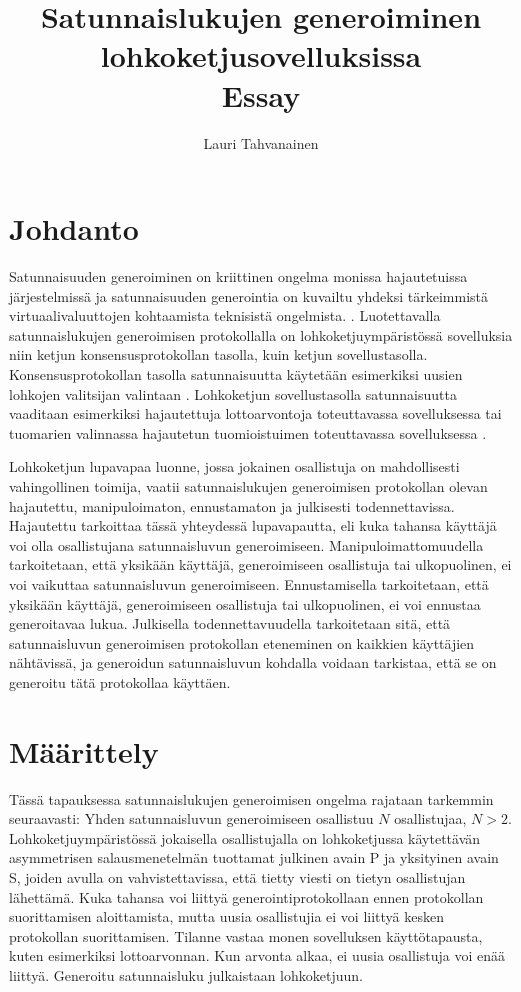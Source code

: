 \documentclass{article}
\title{ Satunnaislukujen generoiminen lohkoketjusovelluksissa \\\small{Essay}}
\author{Lauri Tahvanainen}
\begin{document}
\maketitle

\section{Johdanto}

Satunnaisuuden generoiminen on kriittinen ongelma monissa hajautetuissa järjestelmissä ja satunnaisuuden generointia on kuvailtu yhdeksi tärkeimmistä virtuaalivaluuttojen kohtaamista teknisistä ongelmista. \cite{noauthor_hpoc_2015_nodate}. Luotettavalla satunnaislukujen generoimisen protokollalla on lohkoketjuympäristössä sovelluksia niin ketjun konsensusprotokollan tasolla, kuin ketjun sovellustasolla. Konsensusprotokollan tasolla satunnaisuutta käytetään esimerkiksi uusien lohkojen valitsijan valintaan \cite{chen_algorand_2017}. Lohkoketjun sovellustasolla satunnaisuutta vaaditaan esimerkiksi hajautettuja lottoarvontoja toteuttavassa sovelluksessa \cite{pooltogether_pooltogether_nodate} tai tuomarien valinnassa hajautetun tuomioistuimen toteuttavassa sovelluksessa \cite{lesaege_kleros_2020}. 

Lohkoketjun lupavapaa luonne, jossa jokainen osallistuja on mahdollisesti vahingollinen toimija, vaatii satunnaislukujen generoimisen protokollan olevan hajautettu, manipuloimaton, ennustamaton ja julkisesti todennettavissa. Hajautettu tarkoittaa tässä yhteydessä lupavapautta, eli kuka tahansa käyttäjä voi olla osallistujana satunnaisluvun generoimiseen. Manipuloimattomuudella tarkoitetaan, että yksikään käyttäjä, generoimiseen osallistuja tai ulkopuolinen, ei voi vaikuttaa satunnaisluvun generoimiseen. Ennustamisella tarkoitetaan, että yksikään käyttäjä, generoimiseen osallistuja tai ulkopuolinen, ei voi ennustaa generoitavaa lukua. Julkisella todennettavuudella tarkoitetaan sitä, että satunnaisluvun generoimisen protokollan eteneminen on kaikkien käyttäjien nähtävissä, ja generoidun satunnaisluvun kohdalla voidaan tarkistaa, että se on generoitu tätä protokollaa käyttäen.

\section{Määrittely}

Tässä tapauksessa satunnaislukujen generoimisen ongelma rajataan tarkemmin seuraavasti:
Yhden satunnaisluvun generoimiseen osallistuu $N$ osallistujaa,  $N > 2$. Lohkoketjuympäristössä jokaisella osallistujalla on lohkoketjussa käytettävän asymmetrisen salausmenetelmän tuottamat julkinen avain P ja yksityinen avain S, joiden avulla on vahvistettavissa, että tietty viesti on tietyn osallistujan lähettämä. Kuka tahansa voi liittyä generointiprotokollaan ennen protokollan suorittamisen aloittamista, mutta uusia osallistujia ei voi liittyä kesken protokollan suorittamisen. Tilanne vastaa monen sovelluksen käyttötapausta, kuten esimerkiksi lottoarvonnan. Kun arvonta alkaa, ei uusia osallistuja voi enää liittyä. Generoitu satunnaisluku julkaistaan lohkoketjuun. 
\end{document}

